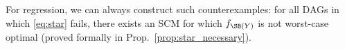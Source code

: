 %
%
%
For regression, 
we can always construct such counterexamples:
for all DAGs in which \eqref{eq:star} fails, there exists an SCM for which $f_{\SB(Y)}$ is not worst-case optimal (proved formally in Prop.~\ref{prop:star_necessary}). 




